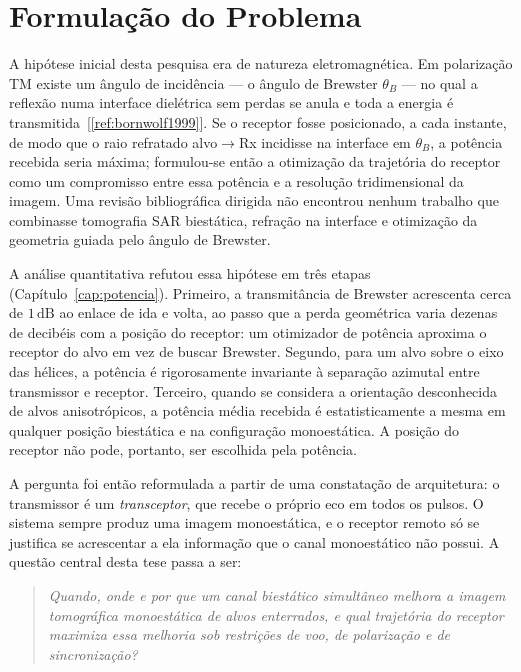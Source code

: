 \documentclass[12pt,a4paper,oneside]{book}
\theoremstyle{remark}
\newcommand{\dB}{\,\mathrm{dB}}
\newcommand{\citar}[1]{[\ref{ref:#1}]}
\theoremstyle{plain}
\theoremstyle{definition}
\begin{document}
\section{Formulação do Problema}
\label{sec:intro_evolucao}

A hipótese inicial desta pesquisa era de natureza eletromagnética. Em polarização TM
existe um ângulo de incidência --- o ângulo de Brewster $\theta_B$ --- no qual
a reflexão numa interface dielétrica sem perdas se anula e toda a energia é
transmitida~\citar{bornwolf1999}. Se o receptor fosse posicionado, a cada
instante, de modo que o raio refratado alvo$\to$Rx incidisse na interface em
$\theta_B$, a potência recebida seria máxima; formulou-se então a otimização
da trajetória do receptor como um compromisso entre essa potência e a
resolução tridimensional da imagem. Uma revisão bibliográfica dirigida não
encontrou nenhum trabalho que combinasse tomografia SAR biestática, refração
na interface e otimização da geometria guiada pelo ângulo de Brewster.

A análise quantitativa refutou essa hipótese em três etapas
(Capítulo~\ref{cap:potencia}). Primeiro, a transmitância de Brewster
acrescenta cerca de $1\dB$ ao enlace de ida e volta, ao passo que a perda
geométrica varia dezenas de decibéis com a posição do receptor: um otimizador
de potência aproxima o receptor do alvo em vez de buscar Brewster. Segundo,
para um alvo sobre o eixo das hélices, a potência é rigorosamente invariante à
separação azimutal entre transmissor e receptor. Terceiro, quando se
considera a orientação desconhecida de alvos anisotrópicos, a potência média
recebida é estatisticamente a mesma em qualquer posição biestática e na
configuração monoestática. A posição do receptor não pode, portanto, ser
escolhida pela potência.

A pergunta foi então reformulada a partir de uma constatação de arquitetura:
o transmissor é um \emph{transceptor}, que recebe o próprio eco em todos os
pulsos. O sistema sempre produz uma imagem monoestática, e o receptor remoto
só se justifica se acrescentar a ela informação que o canal monoestático não
possui. A questão central desta tese passa a ser:

\begin{quote}
\emph{Quando, onde e por que um canal biestático simultâneo melhora a imagem
tomográfica monoestática de alvos enterrados, e qual trajetória do receptor
maximiza essa melhoria sob restrições de voo, de polarização e de
sincronização?}
\end{quote}
\end{document}
